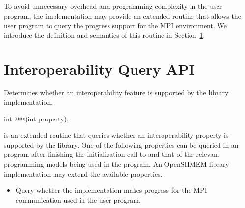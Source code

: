 
To avoid unnecessary overhead and programming complexity in the user program,
the \openshmem implementation may provide an extended \openshmem routine that
allows the user program to query the progress support for the MPI environment.
We introduce the definition and semantics of this routine in
Section~\ref{subsec:interoperability:query}.


\section{Interoperability Query API}
\label{subsec:interoperability:query}

Determines whether an interoperability feature is supported by the \openshmem
library implementation.

\begin{apidefinition}

\begin{Csynopsis}
int @@(int property);
\end{Csynopsis}

\begin{apiarguments}
\end{apiarguments}

 is an extended \openshmem routine that queries
whether an interoperability property is supported by the \openshmem library. One of the
following properties can be queried in an \openshmem program after finishing the
initialization call to \openshmem and that of the relevant programming models
being used in the program. An OpenSHMEM library implementation may extend the
available properties.

\begin{itemize}
    \item {} Query whether the \openshmem
    implementation makes progress for the MPI communication used in the user program.
\end{itemize}

\end{apidefinition}
\color{black}


